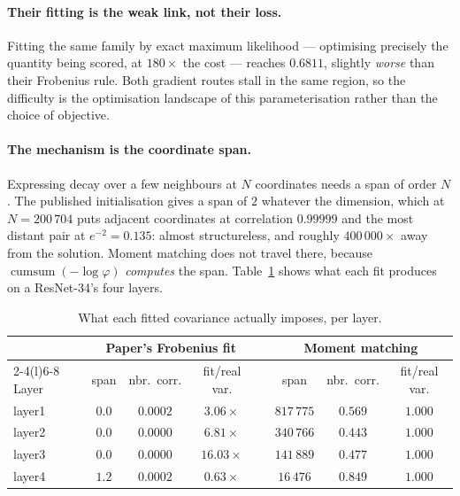 \documentclass[11pt,a4paper]{article}
\begin{document}
\paragraph{Their fitting is the weak link, not their loss.} Fitting the same family by exact
maximum likelihood --- optimising precisely the quantity being scored, at $180\times$ the cost
--- reaches $0.6811$, slightly \emph{worse} than their Frobenius rule. Both gradient routes
stall in the same region, so the difficulty is the optimisation landscape of this
parameterisation rather than the choice of objective.

\paragraph{The mechanism is the coordinate span.} Expressing decay over a few neighbours at $N$
coordinates needs a span of order $N$. The published initialisation gives a span of $2$
whatever the dimension, which at $N = 200\,704$ puts adjacent coordinates at correlation
$0.99999$ and the most distant pair at $e^{-2} = 0.135$: almost structureless, and roughly
$400\,000\times$ away from the solution. Moment matching does not travel there, because
$\operatorname{cumsum}(-\log\varphi)$ \emph{computes} the span. Table~\ref{tab:span} shows what
each fit produces on a ResNet-34's four layers.

\begin{table}[htbp]
\centering
\caption{What each fitted covariance actually imposes, per layer.}
\label{tab:span}
\begin{tabular}{@{}lccc@{}cccc@{}}
\toprule
& \multicolumn{3}{c}{Paper's Frobenius fit} & & \multicolumn{3}{c}{Moment matching} \\
\cmidrule(r){2-4}\cmidrule(l){6-8}
Layer & span & nbr.\ corr. & fit/real var. & & span & nbr.\ corr. & fit/real var. \\
\midrule
layer1 & $\mathbf{0.0}$ & $0.0002$ & $3.06\times$  & & $817\,775$ & $0.569$ & $1.000$ \\
layer2 & $\mathbf{0.0}$ & $0.0000$ & $6.81\times$  & & $340\,766$ & $0.443$ & $1.000$ \\
layer3 & $\mathbf{0.0}$ & $0.0000$ & $16.03\times$ & & $141\,889$ & $0.477$ & $1.000$ \\
layer4 & $1.2$          & $0.0002$ & $0.63\times$  & & $16\,476$  & $0.849$ & $1.000$ \\
\bottomrule
\end{tabular}
\end{table}
\end{document}
